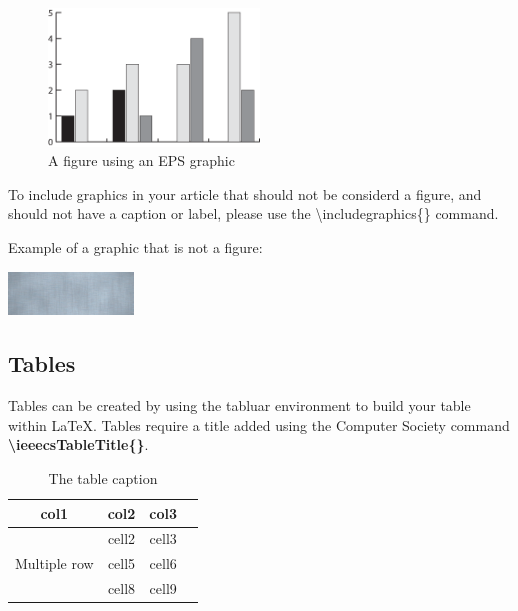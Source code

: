 \documentclass{csmagazine}
\begin{document}
\begin{flushleft}
\begin{figure}[H]
	\begin{center}	
		\includegraphics[width=0.5\textwidth]{figure_2.eps}
		\caption{A figure using an EPS graphic \label{fig:example_fig2}}		
	\end{center}
\end{figure}

To include graphics in your article that should not be considerd a figure, and should not have a caption or label, please use the \textbackslash{}includegraphics\{\} command.

Example of a graphic that is not a figure:

\includegraphics[width=0.25\textwidth]{graphic_1.png}

\subsection{Tables}

Tables can be created by using  the tabluar environment to build your table within \LaTeX. Tables require a title added using the Computer Society command \textbf{\textbackslash{}ieeecsTableTitle\{\}}.



\begin{table}[H]
	\begin{center}
		\caption{The table caption}
		\begin{tabular}{ |c|c|c|c| } 
			\hline
			col1 & col2 & col3 \\
			\hline
			\multirow{3}{4em}{Multiple row} & cell2 & cell3 \\ 
			& cell5 & cell6 \\ 
			& cell8 & cell9 \\ 
			\hline
		\end{tabular}
	\end{center}
\end{table}



\end{flushleft}
\end{document}
